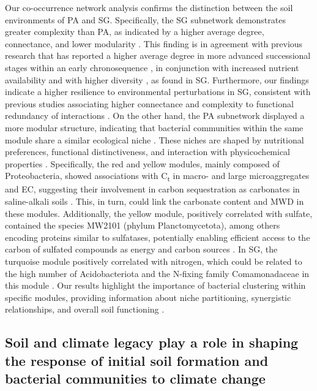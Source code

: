 Our co-occurrence network analysis confirms the distinction between the soil environments of PA and SG. Specifically, the SG subnetwork demonstrates greater complexity than PA, as indicated by a higher average degree, connectance, and lower modularity \citep{Karimi2017, Tu2020}. This finding is in agreement with previous research that has reported a higher average degree in more advanced successional stages within an early chronosequence \citep{Sun2017}, in conjunction with increased nutrient availability \citep{Zhao2019} and with higher diversity \citep{Tu2020}, as found in SG. Furthermore, our findings indicate a higher resilience to environmental perturbations in SG, consistent with previous studies associating higher connectance and complexity to functional redundancy of interactions \citep{Tylianakis2010, Karimi2017, Wu2021}. On the other hand, the PA subnetwork displayed a more modular structure, indicating that bacterial communities within the same module share a similar ecological niche \citep{Tu2020}. These niches are shaped by nutritional preferences, functional distinctiveness, and interaction with physicochemical properties \citep{Banerjee2016}. Specifically, the red and yellow modules, mainly composed of Proteobacteria, showed associations with C\textsubscript{t} in macro- and large microaggregates and EC, suggesting their involvement in carbon sequestration as carbonates in saline-alkali soils \citep{Qu2022}. This, in turn, could link the carbonate content and MWD in these modules. Additionally, the yellow module, positively correlated with sulfate, contained the species MW2101 (phylum Planctomycetota), among others encoding proteins similar to sulfatases, potentially enabling efficient access to the carbon of sulfated compounds as energy and carbon sources \citep{Dedysh2021}. In SG, the turquoise module positively correlated with nitrogen, which could be related to the high number of Acidobacteriota and the N-fixing family Comamonadaceae in this module \citep{Eichorst2018, Vuko2020}. Our results highlight the importance of bacterial clustering within specific modules, providing information about niche partitioning, synergistic relationships, and overall soil functioning \citep{DiniAndreote2014}.

\subsection{Soil and climate legacy play a role in shaping the response of initial soil formation and bacterial communities to climate change}


